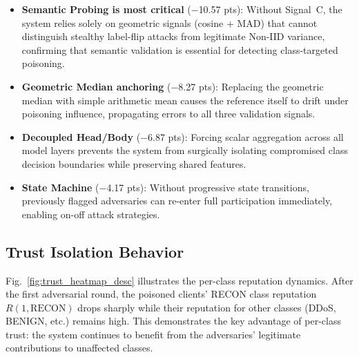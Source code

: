 \documentclass[conference]{IEEEtran}
\begin{document}
\begin{itemize}
    \item \textbf{Semantic Probing is most critical} ($-$10.57 pts): Without Signal~C, the system relies solely on geometric signals (cosine + MAD) that cannot distinguish stealthy label-flip attacks from legitimate Non-IID variance, confirming that semantic validation is essential for detecting class-targeted poisoning.
    \item \textbf{Geometric Median anchoring} ($-$8.27 pts): Replacing the geometric median with simple arithmetic mean causes the reference itself to drift under poisoning influence, propagating errors to all three validation signals.
    \item \textbf{Decoupled Head/Body} ($-$6.87 pts): Forcing scalar aggregation across all model layers prevents the system from surgically isolating compromised class decision boundaries while preserving shared features.
    \item \textbf{State Machine} ($-$4.17 pts): Without progressive state transitions, previously flagged adversaries can re-enter full participation immediately, enabling on-off attack strategies.
\end{itemize}

\subsection{Trust Isolation Behavior}

Fig.~\ref{fig:trust_heatmap_desc} illustrates the per-class reputation dynamics. After the first adversarial round, the poisoned clients' RECON class reputation $R(1, \text{RECON})$ drops sharply while their reputation for other classes (DDoS, BENIGN, etc.) remains high. This demonstrates the key advantage of per-class trust: the system continues to benefit from the adversaries' legitimate contributions to unaffected classes.
\end{document}
